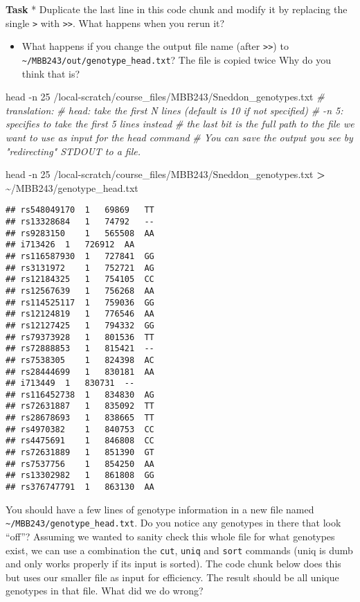 \documentclass[
]{article}
\newenvironment{Shaded}{\begin{snugshade}}{\end{snugshade}}
\newcommand{\AttributeTok}[1]{\textcolor[rgb]{0.77,0.63,0.00}{#1}}
\newcommand{\CommentTok}[1]{\textcolor[rgb]{0.56,0.35,0.01}{\textit{#1}}}
\newcommand{\FunctionTok}[1]{\textcolor[rgb]{0.00,0.00,0.00}{#1}}
\newcommand{\NormalTok}[1]{#1}
\newcommand{\OperatorTok}[1]{\textcolor[rgb]{0.81,0.36,0.00}{\textbf{#1}}}
\providecommand{\tightlist}{%
  \setlength{\itemsep}{0pt}\setlength{\parskip}{0pt}}
\begin{document}
\textbf{Task} * Duplicate the last line in this code chunk and modify it
by replacing the single \texttt{\textgreater{}} with
\texttt{\textgreater{}\textgreater{}}. What happens when you rerun it?

\begin{itemize}
\tightlist
\item
  What happens if you change the output file name (after
  \texttt{\textgreater{}\textgreater{}}) to
  \texttt{\textasciitilde{}/MBB243/out/genotype\_head.txt}? The file is
  copied twice Why do you think that is?
\end{itemize}

\begin{Shaded}
\begin{Highlighting}[]
\FunctionTok{head} \AttributeTok{{-}n}\NormalTok{ 25 /local{-}scratch/course\_files/MBB243/Sneddon\_genotypes.txt}
\CommentTok{\# translation:}
\CommentTok{\# head: take the first N lines (default is 10 if not specified)}
\CommentTok{\# {-}n 5: specifies to take the first 5 lines instead}
\CommentTok{\# the last bit is the full path to the file we want to use as input for the head command}
\CommentTok{\# You can save the output you see by "redirecting" STDOUT to a file. }

\FunctionTok{head} \AttributeTok{{-}n}\NormalTok{ 25 /local{-}scratch/course\_files/MBB243/Sneddon\_genotypes.txt }\OperatorTok{\textgreater{}}\NormalTok{ \textasciitilde{}/MBB243/genotype\_head.txt}
\end{Highlighting}
\end{Shaded}

\begin{verbatim}
## rs548049170  1   69869   TT
## rs13328684   1   74792   --
## rs9283150    1   565508  AA
## i713426  1   726912  AA
## rs116587930  1   727841  GG
## rs3131972    1   752721  AG
## rs12184325   1   754105  CC
## rs12567639   1   756268  AA
## rs114525117  1   759036  GG
## rs12124819   1   776546  AA
## rs12127425   1   794332  GG
## rs79373928   1   801536  TT
## rs72888853   1   815421  --
## rs7538305    1   824398  AC
## rs28444699   1   830181  AA
## i713449  1   830731  --
## rs116452738  1   834830  AG
## rs72631887   1   835092  TT
## rs28678693   1   838665  TT
## rs4970382    1   840753  CC
## rs4475691    1   846808  CC
## rs72631889   1   851390  GT
## rs7537756    1   854250  AA
## rs13302982   1   861808  GG
## rs376747791  1   863130  AA
\end{verbatim}

You should have a few lines of genotype information in a new file named
\texttt{\textasciitilde{}/MBB243/genotype\_head.txt}. Do you notice any
genotypes in there that look ``off''? Assuming we wanted to sanity check
this whole file for what genotypes exist, we can use a combination the
\texttt{cut}, \texttt{uniq} and \texttt{sort} commands (uniq is dumb and
only works properly if its input is sorted). The code chunk below does
this but uses our smaller file as input for efficiency. The result
should be all unique genotypes in that file. What did we do wrong?
\end{document}
